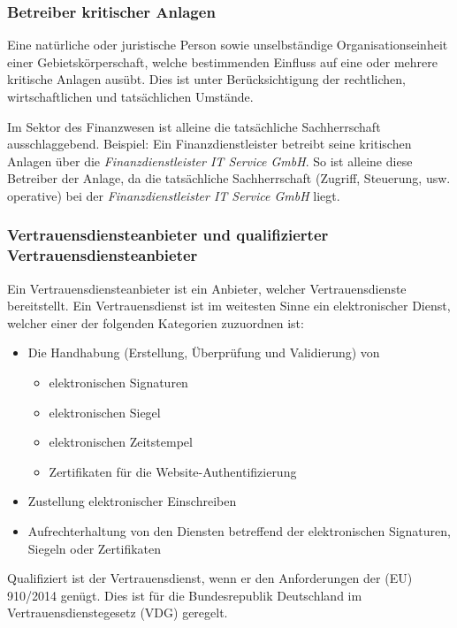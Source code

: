 \documentclass[11pt,a4paper]{article}   %
\begin{document}
            \subsubsection{Betreiber kritischer Anlagen}
            Eine natürliche oder juristische Person sowie unselbständige Organisationseinheit einer Gebietskörperschaft, welche bestimmenden Einfluss auf eine oder mehrere kritische Anlagen ausübt. Dies ist unter Berücksichtigung der rechtlichen, wirtschaftlichen und tatsächlichen Umstände. 

            Im Sektor des Finanzwesen ist alleine die tatsächliche Sachherrschaft  ausschlaggebend. Beispiel: Ein Finanzdienstleister betreibt seine kritischen Anlagen über die \emph{Finanzdienstleister IT Service GmbH}. So ist alleine diese Betreiber der Anlage, da die tatsächliche Sachherrschaft (Zugriff, Steuerung, usw. operative) bei der \emph{Finanzdienstleister IT Service GmbH} liegt.

            \subsubsection{Vertrauensdiensteanbieter und qualifizierter Vertrauensdiensteanbieter}
            Ein Vertrauensdiensteanbieter ist ein Anbieter, welcher Vertrauensdienste bereitstellt. Ein Vertrauensdienst ist im weitesten Sinne ein elektronischer Dienst, welcher einer der folgenden Kategorien zuzuordnen ist:
            \begin{itemize}
                \item Die Handhabung (Erstellung, Überprüfung und Validierung) von
                \begin{itemize}
                    \item elektronischen Signaturen
                    \item elektronischen Siegel
                    \item elektro­nischen Zeitstempel
                    \item Zertifikaten für die Website-Authentifizierung
                \end{itemize}
                \item Zustellung elektronischer Einschreiben
                \item Aufrechterhaltung von den Diensten betreffend der elektronischen Signaturen, Siegeln oder Zertifikaten
            \end{itemize}

            Qualifiziert ist der Vertrauensdienst, wenn er den Anforderungen der (EU) 910/2014 genügt. Dies ist für die Bundesrepublik Deutschland im Vertrauensdienstegesetz (VDG) geregelt.
\end{document}
